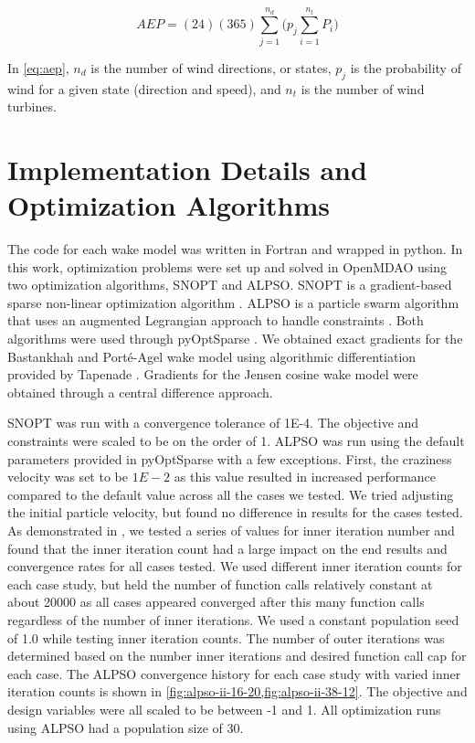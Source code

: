 \documentclass[a4paper]{jpconf}
\begin{document}
\begin{equation} \label{eq:aep}
AEP = (24)(365)\sum_{j=1}^{n_d} \bigg( p_j \sum_{i=1}^{n_t} P_i \bigg)  
\end{equation}

 In \cref{eq:aep}, $n_d$ is the number of wind directions, or states, $p_j$ is the probability of wind for a given state (direction and speed), and $n_t$ is the number of wind turbines.

\section{Implementation Details and Optimization Algorithms}
The code for each wake model was written in Fortran and wrapped in python. In this work, optimization problems were set up and solved in OpenMDAO \cite{gray2010_OpenMDAO} using two optimization algorithms, SNOPT and ALPSO. SNOPT is a gradient-based sparse non-linear optimization algorithm \cite{gill2005}. ALPSO is a particle swarm algorithm that uses an augmented Legrangian approach to handle constraints \cite{jansen2011_alpso}. Both algorithms were used through pyOptSparse \cite{perez2012a}. We obtained exact gradients for the Bastankhah and Port\'e-Agel wake model using algorithmic differentiation provided by Tapenade \cite{tapenade2013}. Gradients for the Jensen cosine wake model were obtained through a central difference approach. 

SNOPT was run with a convergence tolerance of 1E-4. The objective and constraints were scaled to be on the order of 1. ALPSO was run using the default parameters provided in pyOptSparse \cite{wu2020} with a few exceptions. First, the craziness velocity was set to be $1E-2$ as this value resulted in increased performance compared to the default value across all the cases we tested. We tried adjusting the initial particle velocity, but found no difference in results for the cases tested. As demonstrated in \cite{jansen2011_alpso}, we tested a series of values for inner iteration number and found that the inner iteration count had a large impact on the end results and convergence rates for all cases tested. We used different inner iteration counts for each case study, but held the number of function calls relatively constant at about 20000 as all cases appeared converged after this many function calls regardless of the number of inner iterations. We used a constant population seed of 1.0 while testing inner iteration counts. The number of outer iterations was determined based on the number inner iterations and desired function call cap for each case. The ALPSO convergence history for each case study with varied inner iteration counts is shown in \cref{fig:alpso-ii-16-20,fig:alpso-ii-38-12}. The objective and design variables were all scaled to be between -1 and 1.  All optimization runs using ALPSO had a population size of 30.
\end{document}
